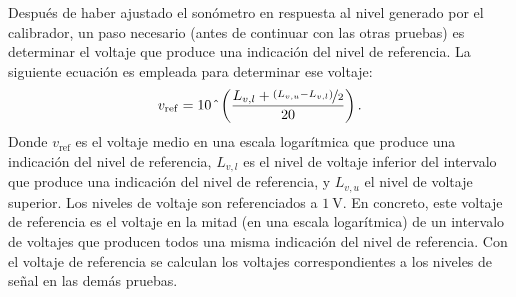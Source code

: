 Después de haber ajustado el sonómetro en respuesta al nivel generado por el calibrador, un paso necesario (antes de continuar con las otras pruebas) es determinar el voltaje que produce una indicación del nivel de referencia.
La siguiente ecuación es empleada para determinar ese voltaje:
%
\begin{equation}
    \label{eq:reference_voltage}
    v_{\mathrm{ref}} = 10\,\hat{\mkern6mu}\left(\frac{L_{v,l}+\nicefrac{\left(L_{v,u} - L_{v,l}\right)}{2}}{20}\right).
\end{equation}
%
Donde $v_{\mathrm{ref}}$ es el voltaje medio en una escala logarítmica que produce una indicación del nivel de referencia, $L_{v,l}$ es el nivel de voltaje inferior del intervalo que produce una indicación del nivel de referencia, y $L_{v,u}$ el nivel de voltaje superior.
Los niveles de voltaje son referenciados a $\qty{1}{\V}$.
En concreto, este voltaje de referencia es el voltaje en la mitad (en una escala logarítmica) de un intervalo de voltajes que producen todos una misma indicación del nivel de referencia.
Con el voltaje de referencia se calculan los voltajes correspondientes a los niveles de señal en las demás pruebas.


